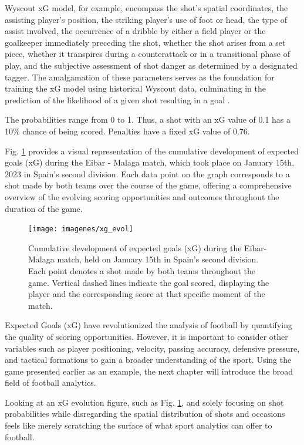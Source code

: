\documentclass[
  twoside,nohyper]{book}
\begin{document}
Wyscout xG model, for example, encompass the shot's spatial coordinates,
the assisting player's position, the striking player's use of foot or
head, the type of assist involved, the occurrence of a dribble by either
a field player or the goalkeeper immediately preceding the shot, whether
the shot arises from a set piece, whether it transpires during a
counterattack or in a transitional phase of play, and the subjective
assessment of shot danger as determined by a designated tagger. The
amalgamation of these parameters serves as the foundation for training
the xG model using historical Wyscout data, culminating in the
prediction of the likelihood of a given shot resulting in a goal
\citep{wyscout}.

The probabilities range from 0 to 1. Thus, a shot with an xG value of
0.1 has a 10\% chance of being scored. Penalties have a fixed xG value of
0.76.

Fig. \ref{fig:xg} provides a visual representation of the cumulative development of expected goals
(xG) during the Eibar - Malaga match, which took place on January 15th,
2023 in Spain's second division. Each data point on the graph
corresponds to a shot made by both teams over the course of the game,
offering a comprehensive overview of the evolving scoring opportunities
and outcomes throughout the duration of the game.

\begin{figure}[H]

{\centering \texttt{[image: imagenes/xg\_evol]} 

}

\caption{Cumulative development of expected goals (xG) during the Eibar-Malaga match, held on January 15th in Spain’s second division. Each point denotes a shot made by both teams throughout the game. Vertical dashed lines indicate the goal scored, displaying the player and the corresponding score at that specific moment of the match.}\label{fig:xg}
\end{figure}

Expected Goals (xG) have revolutionized the analysis of football by quantifying the quality of scoring opportunities. However, it is important to consider other variables such as player positioning, velocity, passing accuracy, defensive pressure, and tactical formations to gain a broader understanding of the sport. Using the game presented earlier as an example, the next chapter will introduce the broad field of football analytics.

Looking at an xG evolution figure, such as Fig. \ref{fig:xg}, and solely focusing on shot probabilities while disregarding the spatial distribution of shots and occasions feels like merely scratching the surface of what sport analytics can offer to football.
\end{document}
